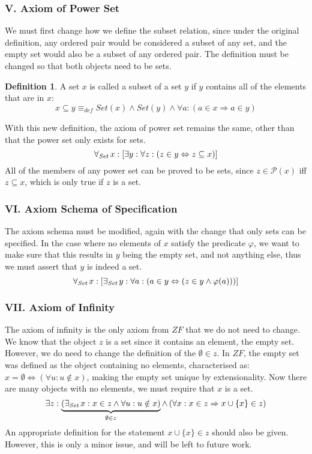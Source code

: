 \documentclass[11pt]{report}
\newcommand{\all}[1]{\forall_{\mathit{#1}}\hspace{0.5mm}}
\newcommand{\ex}[1]{\exists_{\mathit{#1}}\hspace{0.5mm}}
\newcommand{\eqdef}{\equiv_\mathit{def}}
\theoremstyle{definition}
\theoremstyle{theorem}
\theoremstyle{lemma}
\newtheorem{definition}{Definition}[section]
\begin{document}
\subsubsection*{V. Axiom of Power Set}
We must first change how we define the subset relation, since under the original definition, any ordered pair would be considered a subset of any set, and the empty set would also be a subset of any ordered pair.
The definition must be changed so that both objects need to be sets.

\begin{definition} A set $x$ is called a subset of a set $y$ if $y$ contains all of the elements that are in $x$:
$$x\subseteq y \eqdef \mathit{Set}(x) \wedge
               \mathit{Set}(y) \wedge
                \forall a: (a\in x \Rightarrow a\in y)$$
\end{definition}

\noindent
With this new definition, the axiom of power set remains the same, other than that the power set only exists for sets.
$$\all{Set}x: [\exists y:\forall z:
    (z\in y \Leftrightarrow z\subseteq x)]$$
All of the members of any power set can be proved to be sets, since $z\in \mathcal{P}(x)$ iff $z\subseteq x$, which is only true if $z$ is a set.

\subsubsection*{VI. Axiom Schema of Specification}
The axiom schema must be modified, again with the change that only sets can be specified. 
In the case where no elements of $x$ satisfy the predicate $\varphi$, we want to make sure that this results in $y$ being the empty set, and not anything else, thus we must assert that $y$ is indeed a set.
$$\all{Set}x: [\ex{Set} y:\forall a:
    (a\in y \Leftrightarrow (z\in y \wedge \varphi(a)))]$$

\subsubsection*{VII. Axiom of Infinity}
The axiom of infinity is the only axiom from $\mathit{ZF}$ that we do not need to change. 
We know that the object $z$ is a set since it contains an element, the empty set. 
However, we do need to change the definition of the $\emptyset \in z$. In $\mathit{ZF}$, the empty set was defined as the object containing no elements, characterised as: $x = \emptyset \iff (\forall u: u\notin x)$, making the empty set unique by extensionality.
Now there are many objects with no elements, we must require that $x$ is a set.
$$\exists z: \underbrace
                {(\ex{Set}x:x\in z \wedge\forall u:u\notin x)}
                _{{\emptyset\in z}}
                \wedge\hspace{0.6mm} (\forall x: x\in z \Rightarrow x\cup\{x\}\in z)$$
An appropriate definition for the statement $x\cup \{x\} \in z$ should also be given. However, this is only a minor issue, and will be left to future work.
\end{document}
